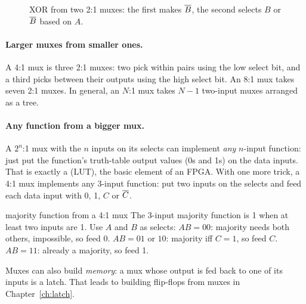 \begin{figure}[h]
\centering
{}
\caption{XOR from two 2:1 muxes: the first makes $\overline{B}$, the second selects $B$ or $\overline{B}$ based on $A$.}
\label{fig:muxxor}
\end{figure}

\paragraph{Larger muxes from smaller ones.} A 4:1 mux is three 2:1 muxes: two pick within pairs using the low select bit, and a third picks between their outputs using the high select bit. An 8:1 mux takes seven 2:1 muxes. In general, an $N$:1 mux takes $N - 1$ two-input muxes arranged as a tree.

\paragraph{Any function from a bigger mux.} A $2^n$:1 mux with the $n$ inputs on its selects can implement \emph{any} $n$-input function: just put the function's truth-table output values (0s and 1s) on the data inputs. That is exactly a  (LUT), the basic element of an FPGA. With one more trick, a 4:1 mux implements any 3-input function: put two inputs on the selects and feed each data input with 0, 1, $C$ or $\overline{C}$.

\begin{worked}{majority function from a 4:1 mux}
The 3-input majority function is 1 when at least two inputs are 1. Use $A$ and $B$ as selects:
$AB = 00$: majority needs both others, impossible, so feed 0.
$AB = 01$ or $10$: majority iff $C = 1$, so feed $C$.
$AB = 11$: already a majority, so feed 1.
\end{worked}

Muxes can also build \emph{memory}: a mux whose output is fed back to one of its inputs is a latch. That leads to building flip-flops from muxes in Chapter~\ref{ch:latch}.

